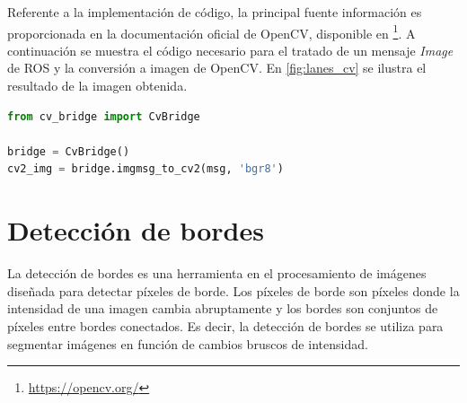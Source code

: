 Referente a la implementación de código, la principal fuente información es proporcionada en la documentación oficial de OpenCV, disponible en \footnote{\url{https://opencv.org/}}. A continuación se muestra el código necesario para el tratado de un mensaje \textit{Image} de ROS y la conversión a imagen de OpenCV. En \ref{fig:lanes_cv} se ilustra el resultado de la imagen obtenida.

\begin{lstlisting}[language=Python]
from cv_bridge import CvBridge

bridge = CvBridge()
cv2_img = bridge.imgmsg_to_cv2(msg, 'bgr8')
\end{lstlisting}

\section{Detección de bordes} \label{sec:detección_de_bordes}

La detección de bordes es una herramienta en el procesamiento de imágenes diseñada para detectar píxeles de borde. Los píxeles de borde son píxeles donde la intensidad de una imagen cambia abruptamente y los bordes son conjuntos de píxeles entre bordes conectados. Es decir, la detección de bordes se utiliza para segmentar imágenes en función de cambios bruscos de intensidad. 

